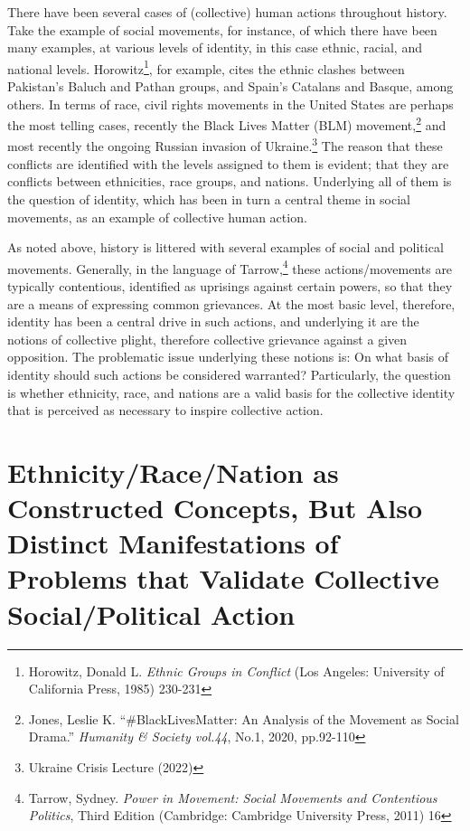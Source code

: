 \documentclass[11pt]{article}
\begin{document}
There have been several cases of (collective) human actions throughout history. Take the example of social movements, for instance, of which there have been many examples, at various levels of identity, in this case ethnic, racial, and national levels. Horowitz\footnote{Horowitz, Donald L. \textit{Ethnic Groups in Conflict} (Los Angeles: University of California Press, 1985) 230-231}, for example, cites the ethnic clashes between Pakistan’s Baluch and Pathan groups, and Spain’s Catalans and Basque, among others. In terms of race, civil rights movements in the United States are perhaps the most telling cases, recently the Black Lives Matter (BLM) movement,\footnote{Jones, Leslie K. “\#BlackLivesMatter: An Analysis of the Movement as Social Drama.” \textit{Humanity \& Society vol.44}, No.1, 2020, pp.92-110} and most recently the ongoing Russian invasion of Ukraine.\footnote{Ukraine Crisis Lecture (2022)} The reason that these conflicts are identified with the levels assigned to them is evident; that they are conflicts between ethnicities, race groups, and nations. Underlying all of them is the question of identity, which has been in turn a central theme in social movements, as an example of collective human action.

As noted above, history is littered with several examples of social and political movements. Generally, in the language of Tarrow,\footnote{Tarrow, Sydney. \textit{Power in Movement: Social Movements and Contentious Politics}, Third Edition (Cambridge: Cambridge University Press, 2011) 16} these actions/movements are typically contentious, identified as uprisings against certain powers, so that they are a means of expressing common grievances. At the most basic level, therefore, identity has been a central drive in such actions, and underlying it are the notions of collective plight, therefore collective grievance against a given opposition. The problematic issue underlying these notions is: On what basis of identity should such actions be considered warranted? Particularly, the question is whether ethnicity, race, and nations are a valid basis for the collective identity that is perceived as necessary to inspire collective action.

\section{Ethnicity/Race/Nation as Constructed Concepts, But Also Distinct Manifestations of Problems that Validate Collective Social/Political Action}
\end{document}
